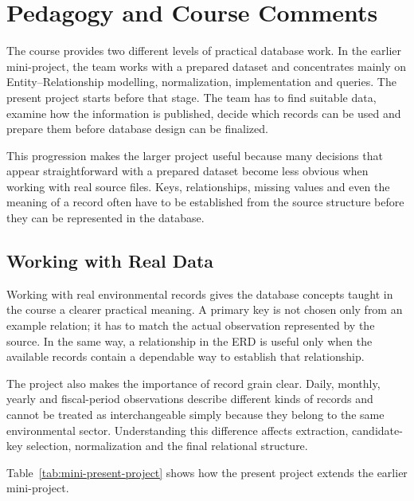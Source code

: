\section{Pedagogy and Course Comments}
\label{sec:pedagogy}

The course provides two different levels of practical database work. In the
earlier mini-project, the team works with a prepared dataset and concentrates
mainly on Entity--Relationship modelling, normalization, implementation and
queries. The present project starts before that stage. The team has to find
suitable data, examine how the information is published, decide which records
can be used and prepare them before database design can be finalized.

This progression makes the larger project useful because many decisions that
appear straightforward with a prepared dataset become less obvious when
working with real source files. Keys, relationships, missing values and even
the meaning of a record often have to be established from the source structure
before they can be represented in the database.

\subsection{Working with Real Data}
\label{subsec:real-data-learning}

Working with real environmental records gives the database concepts taught in
the course a clearer practical meaning. A primary key is not chosen only from
an example relation; it has to match the actual observation represented by the
source. In the same way, a relationship in the ERD is useful only when the
available records contain a dependable way to establish that relationship.

The project also makes the importance of record grain clear. Daily, monthly,
yearly and fiscal-period observations describe different kinds of records and
cannot be treated as interchangeable simply because they belong to the same
environmental sector. Understanding this difference affects extraction,
candidate-key selection, normalization and the final relational structure.

Table~\ref{tab:mini-present-project} shows how the present project extends the
earlier mini-project.

